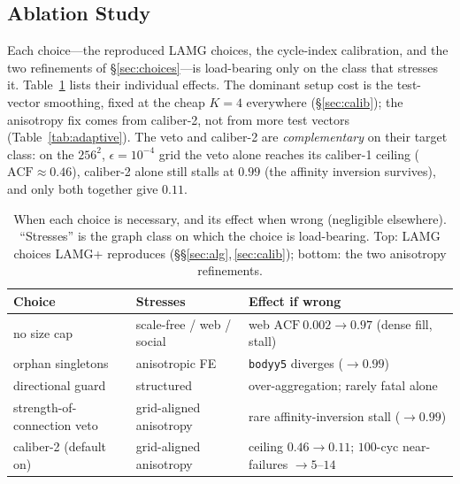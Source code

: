 \documentclass[review]{siamart220329}
\newcommand{\acf}{\mathrm{ACF}}
\begin{document}
\subsection{Ablation Study}\label{sec:ablation}
Each choice---the reproduced LAMG choices, the cycle-index calibration, and the two refinements
of \S\ref{sec:choices}---is load-bearing only on the class that stresses it. Table~\ref{tab:ablate}
lists their individual effects. The dominant setup cost is the test-vector smoothing, fixed at the cheap
$K{=}4$ everywhere (\S\ref{sec:calib}); the anisotropy fix comes from caliber-2, not from more test
vectors (Table~\ref{tab:adaptive}). The veto and
caliber-2 are \emph{complementary} on their target class: on the $256^2$, $\epsilon=10^{-4}$ grid
the veto alone reaches its caliber-1 ceiling ($\acf\approx0.46$), caliber-2 alone still stalls at
$0.99$ (the affinity inversion survives), and only both together give $0.11$.

\begin{table}[t]\centering
\caption{When each choice is necessary, and its effect when wrong (negligible elsewhere).
``Stresses'' is the graph class on which the choice is load-bearing. Top: LAMG choices LAMG+
reproduces (\S\S\ref{sec:alg},\,\ref{sec:calib}); bottom: the two anisotropy refinements.}\label{tab:ablate}
\begin{tabular}{>{\raggedright\arraybackslash}p{3.2cm}
               >{\raggedright\arraybackslash}p{3.1cm}
               >{\raggedright\arraybackslash}p{5.3cm}}
\toprule
Choice & Stresses & Effect if wrong\\
\midrule
no size cap & scale-free / web / social & web $\acf\ 0.002\!\to\!0.97$ (dense fill, stall)\\
orphan singletons & anisotropic FE & \texttt{bodyy5} diverges ($\to0.99$)\\
directional guard & structured & over-aggregation; rarely fatal alone\\
\midrule
strength-of-connection veto & grid-aligned anisotropy & rare affinity-inversion stall ($\to0.99$)\\
caliber-2 (default on) & grid-aligned anisotropy & ceiling $0.46\!\to\!0.11$; $100$-cyc near-failures $\to5$--$14$\\
\bottomrule
\end{tabular}
\end{table}
\end{document}
